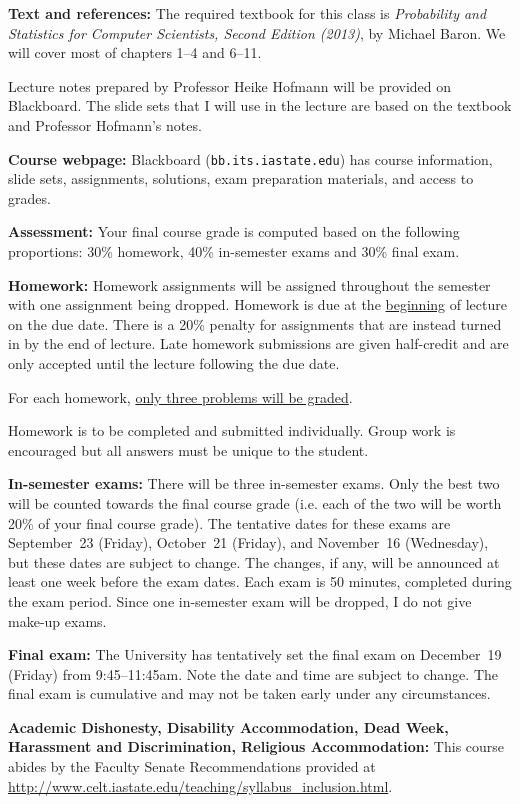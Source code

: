\documentclass[10pt]{article}
\newcommand{\sep}{\vspace*{0.4cm}}
\newcommand{\tab}{\hspace*{0.8cm}}
\begin{document}
\textbf{Text and references:} 
The required textbook for this class is \textit{Probability and Statistics for
  Computer Scientists, Second Edition (2013)}, by Michael Baron. We will cover most of chapters 1--4 and 6--11. 

Lecture notes prepared by Professor Heike Hofmann will be provided on Blackboard.
The slide sets that I will use in the lecture are based on the textbook and
Professor Hofmann's notes.
\sep

\textbf{Course webpage:} Blackboard ({\tt bb.its.iastate.edu})
has course information, slide sets, assignments,
solutions, exam preparation materials, and access to grades.
\sep

\textbf{Assessment:} Your final course grade is computed based on the following proportions:
30\% homework, 40\% in-semester exams and 30\% final exam.
\sep

\newpage
\tab \textbf{Homework:}
Homework assignments will be assigned throughout the semester with one assignment being dropped.
Homework is due at the \underline{beginning} of lecture on the due date.
There is a 20\% penalty for assignments that are instead turned in by the end of lecture.
Late homework submissions are given half-credit and are only accepted until the lecture following the due date.

For each homework, \underline{only three problems will be graded}.

Homework is to be completed and submitted individually. Group work is encouraged but all answers must be unique to the student.
\sep

\tab \textbf{In-semester exams:}
There will be three in-semester exams. Only the best two will be counted towards the final course grade (i.e. each of the two will be worth 20\% of your final course grade).
The tentative dates for these exams are September~23 (Friday), October~21
(Friday), and November~16 (Wednesday), but these dates are subject to change. 
The changes, if any, will be announced at least one week before the exam dates.
Each exam is 50 minutes, completed during the exam period.
Since one in-semester exam will be dropped, I do not give make-up exams.
\sep

\tab \textbf{Final exam:}
The University has tentatively set the final exam on December~19 (Friday)
from 9:45--11:45am. Note the date and time are subject to change.
The final exam is cumulative and may not be taken early under any circumstances.
\sep

\tab \textbf{Academic Dishonesty, Disability Accommodation, Dead Week, Harassment and Discrimination, Religious Accommodation:} This course abides by the Faculty Senate Recommendations provided at \url{http://www.celt.iastate.edu/teaching/syllabus_inclusion.html}.
\end{document}
